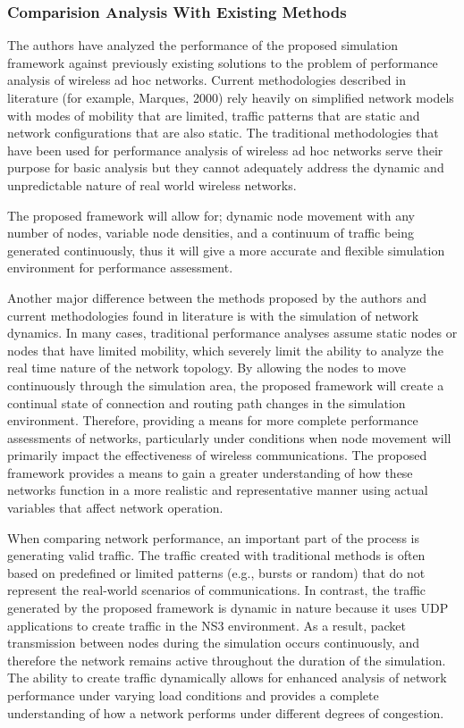 \documentclass[a4paper,fleqn]{cas-dc}
\numberwithin{equation}{section}
\begin{document}
\subsubsection{Comparision Analysis With Existing Methods}
The authors have analyzed the performance of the proposed simulation framework against previously existing solutions to the problem of performance analysis of wireless ad hoc networks. Current methodologies described in literature (for example, Marques, 2000) rely heavily on simplified network models with modes of mobility that are limited, traffic patterns that are static and network configurations that are also static. The traditional methodologies that have been used for performance analysis of wireless ad hoc networks serve their purpose for basic analysis but they cannot adequately address the dynamic and unpredictable nature of real world wireless networks.

The proposed framework will allow for; dynamic node movement with any number of nodes, variable node densities, and a continuum of traffic being generated continuously, thus it will give a more accurate and flexible simulation environment for performance assessment.

Another major difference between the methods proposed by the authors and current methodologies found in literature is with the simulation of network dynamics. In many cases, traditional performance analyses assume static nodes or nodes that have limited mobility, which severely limit the ability to analyze the real time nature of the network topology. By allowing the nodes to move continuously through the simulation area, the proposed framework will create a continual state of connection and routing path changes in the simulation environment. Therefore, providing a means for more complete performance assessments of networks, particularly under conditions when node movement will primarily impact the effectiveness of wireless communications. The proposed framework provides a means to gain a greater understanding of how these networks function in a more realistic and representative manner using actual variables that affect network operation.

When comparing network performance, an important part of the process is generating valid traffic. The traffic created with traditional methods is often based on predefined or limited patterns (e.g., bursts or random) that do not represent the real-world scenarios of communications. In contrast, the traffic generated by the proposed framework is dynamic in nature because it uses UDP applications to create traffic in the NS3 environment. As a result, packet transmission between nodes during the simulation occurs continuously, and therefore the network remains active throughout the duration of the simulation. The ability to create traffic dynamically allows for enhanced analysis of network performance under varying load conditions and provides a complete understanding of how a network performs under different degrees of congestion.
\end{document}
